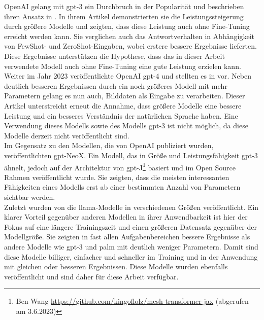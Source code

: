 OpenAI gelang mit \ac{gpt}-3 ein Durchbruch in der Popularität und beschrieben ihren Ansatz in \citet{gpt3}.
In ihrem Artikel demonstrierten sie die Leistungssteigerung durch größere Modelle und zeigten, dass diese Leistung auch ohne Fine-Tuning erreicht werden kann.
Sie verglichen auch das Antwortverhalten in Abhängigkeit von FewShot- und ZeroShot-Eingaben, wobei erstere bessere Ergebnisse lieferten. 
Diese Ergebnisse unterstützen die Hypothese, dass das in dieser Arbeit verwendete Modell auch ohne Fine-Tuning eine gute Leistung erzielen kann.\\

Weiter im Jahr 2023 veröffentlichte OpenAI \ac{gpt}-4 und stellten es in \citet{gpt4} vor. 
Neben deutlich besseren Ergebnissen durch ein noch größeres Modell mit mehr Parametern gelang es nun auch, Bilddaten als Eingabe zu verarbeiten. 
Dieser Artikel unterstreicht erneut die Annahme, dass größere Modelle eine bessere Leistung und ein besseres Verständnis der natürlichen Sprache haben.
Eine Verwendung dieses Modells sowie des Modells \ac{gpt}-3 ist nicht möglich, da diese Modelle derzeit nicht veröffentlicht sind.\\

Im Gegensatz zu den Modellen, die von OpenAI publiziert wurden, veröffentlichten \citet{gpt_neox} \ac{gpt}-NeoX. 
Ein Modell, das in Größe und Leistungsfähigkeit \ac{gpt}-3 ähnelt, jedoch auf der Architektur von \ac{gpt}-J\footnote{Ben Wang \url{https://github.com/kingoflolz/mesh-transformer-jax} (abgerufen am 3.6.2023)} basiert und im Open Source Rahmen veröffentlicht wurde. 
Sie zeigten, dass die meisten interessanten Fähigkeiten eines Modells erst ab einer bestimmten Anzahl von Parametern sichtbar werden.\\

Zuletzt wurden von \citet{llama} die \ac{llama}-Modelle in verschiedenen Größen veröffentlicht. 
Ein klarer Vorteil gegenüber anderen Modellen in ihrer Anwendbarkeit ist hier der Fokus auf eine längere Trainingszeit und einen größeren Datensatz gegenüber der Modellgröße. 
Sie zeigten in fast allen Aufgabenbereichen bessere Ergebnisse als andere Modelle wie \ac{gpt}-3 und \ac{palm} mit deutlich weniger Parametern. 
Damit sind diese Modelle billiger, einfacher und schneller im Training und in der Anwendung mit gleichen oder besseren Ergebnissen. 
Diese Modelle wurden ebenfalls veröffentlicht und sind daher für diese Arbeit verfügbar.

